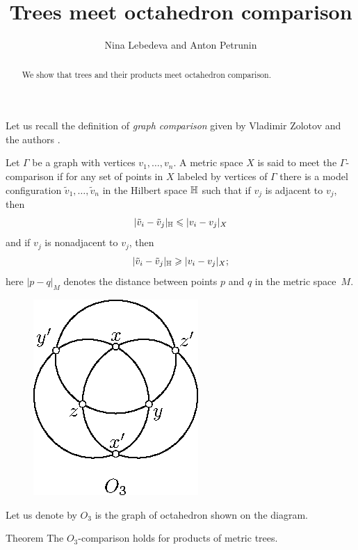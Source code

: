 \documentclass{article}
\begin{document}


\title{Trees meet octahedron comparison}
\author{Nina Lebedeva and Anton Petrunin}

\date{}
\maketitle
\begin{abstract}
We show that trees and their products meet octahedron comparison.
\end{abstract}

Let us recall the definition of \emph{graph comparison} given by Vladimir Zolotov and the authors \cite{lebedeva-petrunin-zolotov}.

Let $\Gamma$ be a graph with vertices $v_1,\dots,v_n$.
A metric space $X$ is said to meet the $\Gamma$-comparison if for any set of points in $X$ labeled by vertices of $\Gamma$ there is a model configuration $\tilde v_1,\dots,\tilde v_n$ in the Hilbert space $\mathbb H$ such that 
if $v_j$ is adjacent to $v_j$, then
\[|\tilde v_i-\tilde v_j|_{\mathbb H}\leqslant | v_i-v_j|_{X}\]
and
if $v_j$ is nonadjacent to $v_j$, then
\[|\tilde v_i-\tilde v_j|_{\mathbb H}\geqslant | v_i-v_j|_{X};\]
here $|p-q|_M$ denotes the distance between points $p$ and $q$ in the metric space~$M$.

\begin{figure}
\vskip-2mm
\centering
\includegraphics{mppics/pic-30}
\end{figure}

Let us denote by $O_3$ is the graph of octahedron shown on the diagram.

\begin{thm}{Theorem}
The $O_3$-comparison holds for products of metric trees.
\end{thm}
\end{document}
